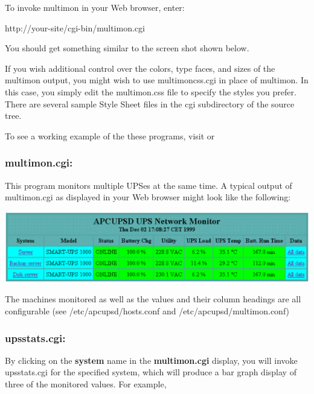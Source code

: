 {{{{{{{{To invoke multimon in your Web browser, enter:  

http://\lt{}your-site\gt{}/cgi-bin/multimon.cgi  

You should get something similar to the screen shot shown below.  

If you wish additional control over the colors, type faces, and sizes of the
multimon output, you might wish to use multimoncss.cgi in place of multimon.
In this case, you simply edit the multimon.css file to specify the styles you
prefer.  There are several sample Style Sheet files in the cgi subdirectory of
the source tree.  

To see a working example of the these programs, visit 
 or 

\label{multimon_005fcgi}

\subsubsection*{multimon.cgi:}

\label{index-multimon-126}
\label{index-CGI_002c-multimon-127}
This program monitors multiple UPSes at the same time. A typical output of
multimon.cgi as displayed in your Web browser might look like the following:  

\includegraphics{./multimon.eps}  

The machines monitored as well as the values and their column headings are all
configurable (see /etc/apcupsd/hosts.conf and /etc/apcupsd/multimon.conf) 

\label{upsstats_005fcgi}

\subsubsection*{upsstats.cgi:}

\label{index-upsstats-128}
\label{index-CGI_002c-upsstats-129}
By clicking on the {\bf system} name in the {\bf multimon.cgi} display, you
will invoke upsstats.cgi for the specified system, which will produce a bar
graph display of three of the monitored values. For example,  

}}}}}}}}
